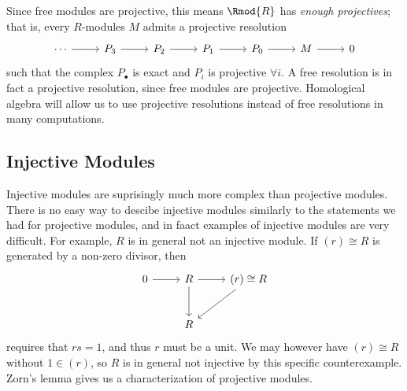 Since free modules are projective, this means $\Rmod{R} $ has \emph{enough projectives}; that is, every $R$-modules $M$ admits a projective resolution
\[\begin{tikzcd}[row sep = 2.5em, column sep = 2.5em]
	\cdots \arrow[r]&P_3\arrow[r]&P_2\arrow[r]&P_1\arrow[r]&P_0\arrow[r]&M\arrow[r]&0
\end{tikzcd}\]
such that the complex $P_\bullet $ is exact and $P_i$ is projective $\forall i$. A free resolution is in fact a projective resolution, since free modules are projective. Homological algebra will allow us to use projective resolutions instead of free resolutions in many computations.

\subsection{Injective Modules}
Injective modules are suprisingly much more complex than projective modules. There is no easy way to descibe injective modules similarly to the statements we had for projective modules, and in faact examples of injective modules are very difficult. For example, $R$ is in general not an injective module. If $(r)\cong R$ is generated by a non-zero divisor, then
\[\begin{tikzcd}[row sep = 2.5em, column sep = 2.5em]
	0\arrow[r]&R\arrow[d]\arrow[r]&(r)\cong R\arrow[dl]\\
		  &R
\end{tikzcd}\]
requires that $rs=1$, and thus $r$ must be a unit. We may however have $(r)\cong R$ without $1\in (r)$, so $R$ is in general not injective by this specific counterexample. Zorn's lemma gives us a characterization of projective modules.

